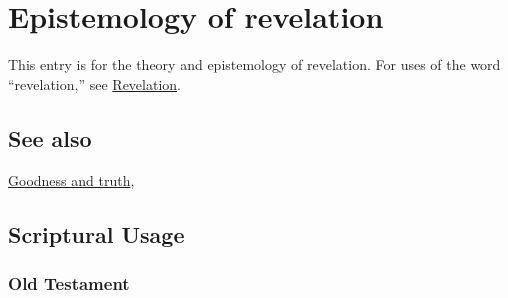 \section{Epistemology of revelation}
	\label{EPIST-REVELATION}
	
	This entry is for the theory and epistemology of revelation. For uses of the word ``revelation,'' see \hyperref[REVELATION]{Revelation}.
	
\subsection{See also}

	\hyperref[GOODNESS-truth]{Goodness and truth},





\subsection{Scriptural Usage} %
	\label{EPIST-REVELATION-SCRIPTURES}

	\subsubsection{Old Testament} %
		\label{EPIST-REVELATION-OT}
	
